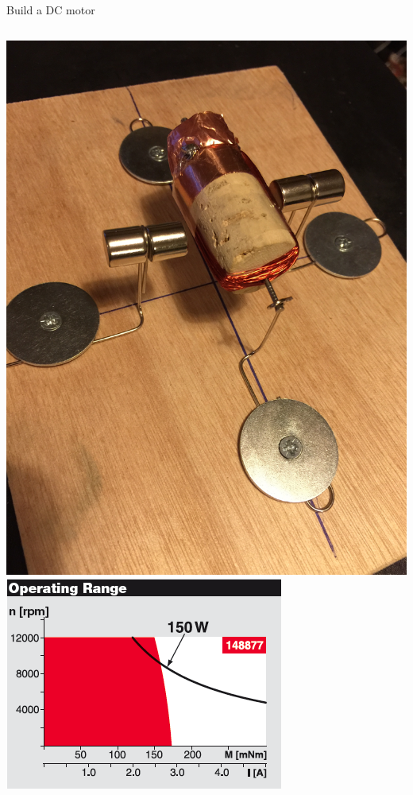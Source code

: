 \documentclass[compress]{beamer}
\begin{document}
\begin{frame}{Build a DC motor}
\begin{columns}
\begin{column}{0.45\linewidth}
            \begin{center}
                \includegraphics[width=0.6\columnwidth]{better-dc-motor}\\
                \includegraphics[width=0.8\columnwidth]{motor-characterisation}
            \end{center}

        \end{column}
    \end{columns}
\end{frame}
\end{document}
